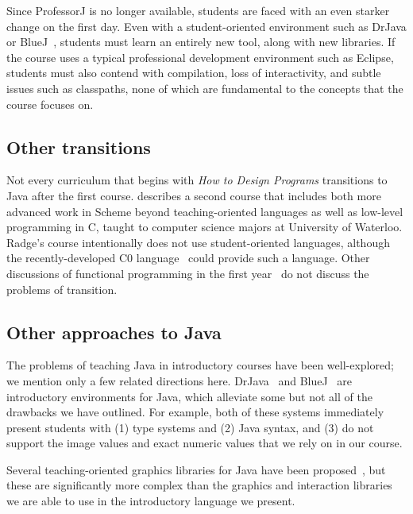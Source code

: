 \documentclass[submission,copyright]{eptcs}
\def\htdp{\emph{How to Design Programs}\xspace}
\def\profj{{ProfessorJ}\xspace}
\begin{document}
Since \profj is no longer available, students are faced with an even
starker change on the first day.  Even with a student-oriented
environment such as DrJava or BlueJ~\cite{dvanhorn:Allen2002DrJava,
  dvanhorn:Hsia2005Taming}, students must learn an entirely new tool,
along with new libraries.
If the course uses a typical professional development environment such
as Eclipse, students must also contend with compilation, loss of
interactivity, and subtle issues such as classpaths, none of which are
fundamental to the concepts that the course focuses on.


\subsection{Other transitions}

Not every curriculum that begins with \htdp transitions to Java after
the first course.  \citet{dvanhorn:Ragde2008Chilling} describes a
second course that includes both more advanced work in Scheme beyond
teaching-oriented languages as well as low-level programming in C,
taught to computer science majors at University of Waterloo.  Radge's
course intentionally does not use student-oriented languages, although
the recently-developed C0 language~\cite{local:c0} could provide such
a language. Other discussions of functional programming in the first
year~\cite{dvanhorn:Chakravarty2004Risks} do not discuss the problems
of transition.

\subsection{Other approaches to Java}

The problems of teaching Java in introductory courses have been
well-explored; we mention only a few related directions here.
DrJava~\cite{dvanhorn:Allen2002DrJava} and
BlueJ~\cite{dvanhorn:Hsia2005Taming,dvanhorn:Kolling2003} are
introductory environments for Java, which alleviate some but not all
of the drawbacks we have outlined.
%
For example, both of these systems immediately present students with
(1) type systems and (2) Java syntax, and (3) do not support the image
values and exact numeric values that we rely on in our course.


Several teaching-oriented graphics libraries for Java have been
proposed~\cite{dvanhorn:Bruce2001Library,dvanhorn:Alphonce2003Using},
but these are significantly more complex than the graphics and
interaction libraries we are able to use in the introductory language
we present.
\end{document}
